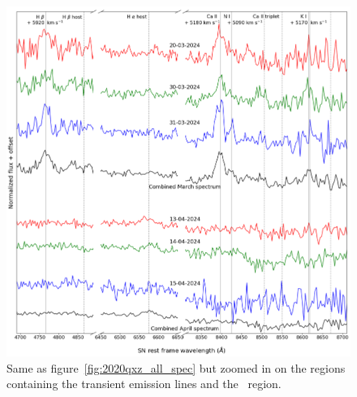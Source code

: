 \documentclass[a4paper,oneside,12pt, class=Latex/Classes/PhDthesisPSnPDF, crop=false]{standalone}
\begin{document}
\begin{figure}[h!]
    \centering
    \includegraphics[width=\textwidth]{../Images/chapter_5/2020qxz_all_spec_zoom.png}
    \caption[Individual spectra of SN 2020qxz zoomed in on transient line regions.]{Same as figure~\ref{fig:2020qxz_all_spec} but zoomed in on the regions containing the transient emission lines and the \Halpha\ region.}
    \label{2020qxz_all_spec_zoom}
\end{figure}
\end{document}
